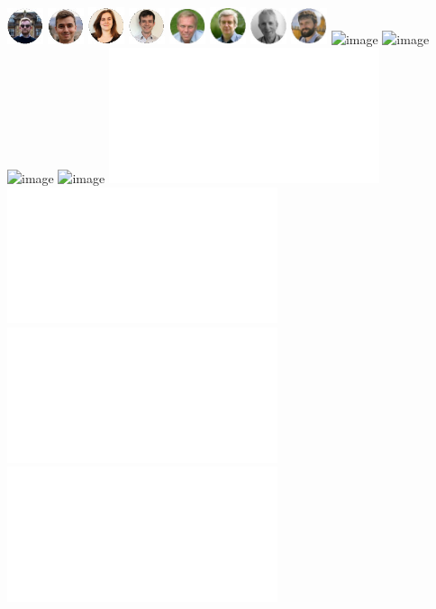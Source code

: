 \documentclass[aspectratio=169, handout]{beamer}
\begin{document}
\begin{frame}
\begin{columns}
        \includegraphics[width=0.08\textwidth]{figures/headshots/tamas-stenzel-polychord.jpg}%
        \includegraphics[width=0.08\textwidth]{figures/headshots/david-yallup-polychord.jpg}%
        \includegraphics[width=0.08\textwidth]{figures/headshots/rebecca-handley-polychord.jpg}%
        \includegraphics[width=0.08\textwidth]{figures/headshots/adam-ormondroyd-polychord.jpg}%
        \includegraphics[width=0.08\textwidth]{figures/headshots/mike-hobson-polychord.jpg}%
        \includegraphics[width=0.08\textwidth]{figures/headshots/anthony-lasenby-polychord.jpg}%
        \includegraphics[width=0.08\textwidth]{figures/headshots/mike-handley-polychord.jpg}%
        \includegraphics[width=0.08\textwidth]{figures/headshots/will-handley-polychord.jpg}%
        \includegraphics<1|handout:0>[width=\textwidth]{figures/protein_1.png}%
        \includegraphics<2          >[width=\textwidth]{figures/protein_2.png}%
        \includegraphics<3|handout:0>[width=\textwidth]{figures/protein_3.png}%
        \includegraphics<4|handout:0>[width=\textwidth]{figures/lcoe.png}%
        \includegraphics<5|handout:0>[width=\textwidth]{figures/DKL_contour-cropped-crop.pdf}%
        \includegraphics<6|handout:0>[width=\textwidth]{figures/mean_DKL_optimise-3-crop.pdf}%
        \includegraphics<7|handout:0>[width=\textwidth]{figures/mean_DKL_optimise-4-crop.pdf}%
        \includegraphics<8|handout:0>[width=\textwidth]{figures/mean_DKL_optimise-5-crop.pdf}%
    \end{columns}
\end{frame}
\end{document}
